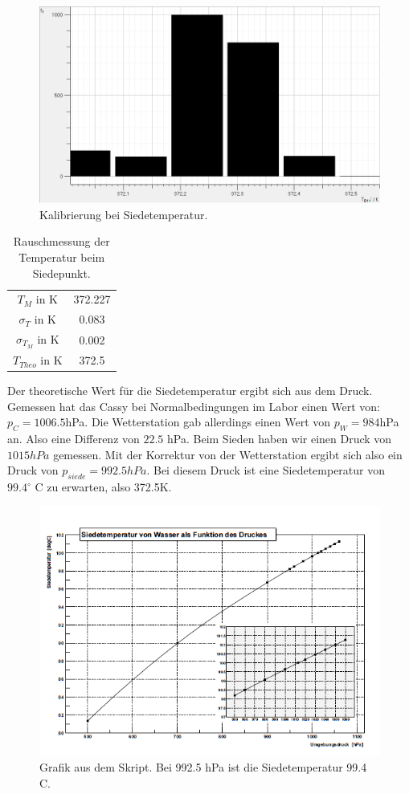 \documentclass[12pt,a4paper]{article}
\begin{document}
\begin{figure}[H]
\centering
\includegraphics[scale=0.5]{Bilder/heizen_histogramm.png}
\caption{Kalibrierung bei Siedetemperatur.}
\end{figure}


\begin{table}[H]\centering
\caption{Rauschmessung der Temperatur beim Siedepunkt.}
\begin{tabular}{c|c}
$T_M$ in K & 372.227  \\
$\sigma_T$ in K & 0.083  \\
$\sigma_{T_M}$ in K & 0.002 \\
$T_{Theo}$ in K & 372.5 \\
\end{tabular} 
\end{table}
Der theoretische Wert für die Siedetemperatur ergibt sich aus dem Druck. Gemessen hat das Cassy bei Normalbedingungen im Labor einen Wert von: $p_C=1006.5$hPa. Die Wetterstation gab allerdings einen Wert von $p_W=984$hPa an. Also eine Differenz von $22.5$ hPa. Beim Sieden haben wir einen Druck von $1015 hPa$ gemessen. Mit der Korrektur von der Wetterstation ergibt sich also ein Druck von $p_{siede}=992.5hPa$. Bei diesem Druck ist eine Siedetemperatur von $99.4^{\circ}$ C zu erwarten, also 372.5K.  
\begin{figure}[H]
\centering
\includegraphics[scale=1]{Bilder/SiedeTemp_Druck.PNG}
\caption{Grafik aus dem Skript. Bei 992.5 hPa ist die Siedetemperatur 99.4 C.}
\end{figure}
\end{document}
